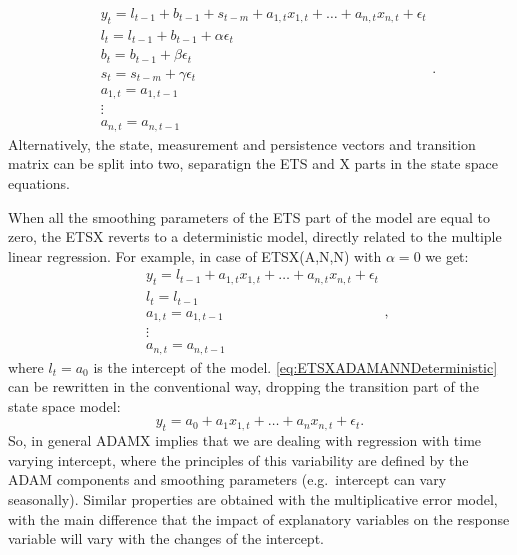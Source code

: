 \documentclass[
]{book}
\theoremstyle{definition}
\theoremstyle{definition}
\theoremstyle{definition}
\theoremstyle{definition}
\theoremstyle{remark}
\begin{document}
\begin{equation}
  \begin{aligned}
    & y_{t} = l_{t-1} + b_{t-1} + s_{t-m} + a_{1,t} x_{1,t} + \dots + a_{n,t} x_{n,t} + \epsilon_t \\
    & l_t = l_{t-1} + b_{t-1} + \alpha \epsilon_t \\
    & b_t = b_{t-1} + \beta \epsilon_t \\
    & s_t = s_{t-m} + \gamma \epsilon_t \\
    & a_{1,t} = a_{1,t-1} \\
    & \vdots \\
    & a_{n,t} = a_{n,t-1}
  \end{aligned}.
  \label{eq:ETSXADAMAAA}
\end{equation}
Alternatively, the state, measurement and persistence vectors and transition matrix can be split into two, separatign the ETS and X parts in the state space equations.

When all the smoothing parameters of the ETS part of the model are equal to zero, the ETSX reverts to a deterministic model, directly related to the multiple linear regression. For example, in case of ETSX(A,N,N) with \(\alpha=0\) we get:
\begin{equation}
  \begin{aligned}
    & y_{t} = l_{t-1} + a_{1,t} x_{1,t} + \dots + a_{n,t} x_{n,t} + \epsilon_t \\
    & l_t = l_{t-1} \\
    & a_{1,t} = a_{1,t-1} \\
    & \vdots \\
    & a_{n,t} = a_{n,t-1}
  \end{aligned},
  \label{eq:ETSXADAMANNDeterministic}
\end{equation}
where \(l_t=a_0\) is the intercept of the model. \eqref{eq:ETSXADAMANNDeterministic} can be rewritten in the conventional way, dropping the transition part of the state space model:
\begin{equation}
    y_{t} = a_0 + a_{1} x_{1,t} + \dots + a_{n} x_{n,t} + \epsilon_t .
  \label{eq:linearRegression}
\end{equation}
So, in general ADAMX implies that we are dealing with regression with time varying intercept, where the principles of this variability are defined by the ADAM components and smoothing parameters (e.g.~intercept can vary seasonally). Similar properties are obtained with the multiplicative error model, with the main difference that the impact of explanatory variables on the response variable will vary with the changes of the intercept.
\end{document}
